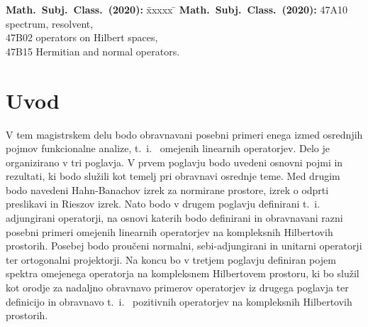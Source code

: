 \documentclass[12pt,a4paper,oneside,fleqn,openany]{book}
\begin{document}
\begin{tabbing}
\textbf{Math.\ Subj.\ Class.\ (2020):} \=xxxxx \=\kill
\textbf{Math.\ Subj.\ Class.\ (2020):} \>47A10 spectrum, resolvent,\\
\> 47B02 operators on Hilbert spaces,\\
\>47B15 Hermitian and normal operators.\\
\end{tabbing}




\tableofcontents



\newoddpage
\pagestyle{fancy}

\cleardoublepage
{}

\chapter*{Uvod}


V tem magistrskem delu bodo obravnavani posebni primeri enega izmed osrednjih pojmov funkcionalne analize, t.~i.~ omejenih linearnih operatorjev. Delo je organizirano v tri poglavja. V prvem poglavju bodo uvedeni osnovni pojmi in rezultati, ki bodo služili kot temelj pri obravnavi osrednje teme. Med drugim bodo navedeni Hahn-Banachov izrek za normirane prostore, izrek o odprti preslikavi in Rieszov izrek. Nato bodo v drugem poglavju definirani t.~i.~ adjungirani operatorji, na osnovi katerih bodo definirani in obravnavani razni posebni primeri omejenih linearnih operatorjev na kompleksnih Hilbertovih prostorih. Posebej bodo proučeni normalni, sebi-adjungirani in unitarni operatorji ter ortogonalni projektorji. Na koncu bo v tretjem poglavju definiran pojem spektra omejenega operatorja na kompleksnem Hilbertovem prostoru, ki bo služil kot orodje za nadaljno obravnavo primerov operatorjev iz drugega poglavja ter definicijo in obravnavo t.~i.~ pozitivnih operatorjev na kompleksnih Hilbertovih prostorih.
\end{document}
